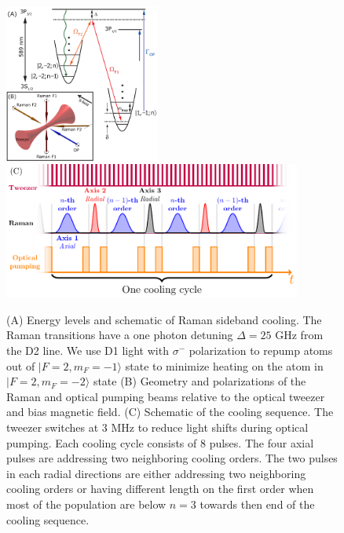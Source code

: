 \documentclass[aps,prl,twocolumn,groupedaddress]{revtex4-1}
\begin{document}
\begin{figure}
  \includegraphics[height=5.2cm]{imgs/Na_RSC_schematic.pdf}
  \includegraphics[height=4.5cm]{sequence.pdf}
  \caption{(A) Energy levels and schematic of Raman sideband cooling.
    The Raman transitions have a one photon detuning $\Delta=25$ GHz from the D2 line.
    We use D1 light with $\sigma^-$ polarization to repump atoms out of $|F=2,m_F=-1\rangle$
    state to minimize heating on the atom in $|F=2,m_F=-2\rangle$ state
    (B) Geometry and polarizations of the Raman and optical pumping beams relative to the
    optical tweezer and bias magnetic field.
    (C) Schematic of the cooling sequence. The tweezer switches at 3 MHz to
    reduce light shifts during optical pumping. Each cooling cycle consists of $8$ pulses.
    The four axial pulses are addressing two neighboring cooling orders.
    The two pulses in each radial directions are either addressing two neighboring cooling orders
    or having different length on the first order when most of the population are below $n=3$
    towards then end of the cooling sequence.
    \label{f-setup}}
\end{figure}
\end{document}

